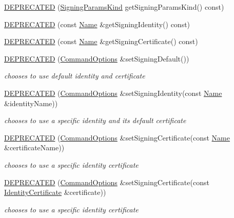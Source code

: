 \begin{DoxyCompactItemize}
\hyperlink{classndn_1_1nfd_1_1CommandOptions_ac2e48d640e60d11b696a2587b37b131d}{D\+E\+P\+R\+E\+C\+A\+T\+ED} (\hyperlink{classndn_1_1nfd_1_1CommandOptions_a8ff10b025de45d0451470ccf83af5594}{Signing\+Params\+Kind} get\+Signing\+Params\+Kind() const)
\item 
\hyperlink{classndn_1_1nfd_1_1CommandOptions_a683025be25c11b8c663e20c807d8eaef}{D\+E\+P\+R\+E\+C\+A\+T\+ED} (const \hyperlink{classndn_1_1Name}{Name} \&get\+Signing\+Identity() const)
\item 
\hyperlink{classndn_1_1nfd_1_1CommandOptions_afae3078789835dec1e38104725025d21}{D\+E\+P\+R\+E\+C\+A\+T\+ED} (const \hyperlink{classndn_1_1Name}{Name} \&get\+Signing\+Certificate() const)
\item 
\hyperlink{classndn_1_1nfd_1_1CommandOptions_abf86d4348ccf52b2ad3279927cf6af37}{D\+E\+P\+R\+E\+C\+A\+T\+ED} (\hyperlink{classndn_1_1nfd_1_1CommandOptions}{Command\+Options} \&set\+Signing\+Default())
\begin{DoxyCompactList}\small\item\em chooses to use default identity and certificate \end{DoxyCompactList}\item 
\hyperlink{classndn_1_1nfd_1_1CommandOptions_a7ba5414b329dd366a7788734b16a1cd3}{D\+E\+P\+R\+E\+C\+A\+T\+ED} (\hyperlink{classndn_1_1nfd_1_1CommandOptions}{Command\+Options} \&set\+Signing\+Identity(const \hyperlink{classndn_1_1Name}{Name} \&identity\+Name))
\begin{DoxyCompactList}\small\item\em chooses to use a specific identity and its default certificate \end{DoxyCompactList}\item 
\hyperlink{classndn_1_1nfd_1_1CommandOptions_a5c639d07a0ca7316479955f7df5fc437}{D\+E\+P\+R\+E\+C\+A\+T\+ED} (\hyperlink{classndn_1_1nfd_1_1CommandOptions}{Command\+Options} \&set\+Signing\+Certificate(const \hyperlink{classndn_1_1Name}{Name} \&certificate\+Name))
\begin{DoxyCompactList}\small\item\em chooses to use a specific identity certificate \end{DoxyCompactList}\item 
\hyperlink{classndn_1_1nfd_1_1CommandOptions_a56e78b886017b88d30bfb09ac3f60aff}{D\+E\+P\+R\+E\+C\+A\+T\+ED} (\hyperlink{classndn_1_1nfd_1_1CommandOptions}{Command\+Options} \&set\+Signing\+Certificate(const \hyperlink{classndn_1_1IdentityCertificate}{Identity\+Certificate} \&certificate))
\begin{DoxyCompactList}\small\item\em chooses to use a specific identity certificate \end{DoxyCompactList}\end{DoxyCompactItemize}
